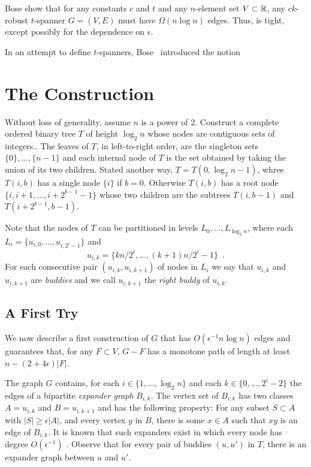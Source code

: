 \documentclass{patmorin}
\begin{document}
Bose \etal \cite[Theorem~X]{bxx} show that for any constants $c$ and $t$ and any $n$-element set $V\subset\mathbb{R}$, any $ck$-robust $t$-spanner $G=(V,E)$ must have $\Omega(n\log n)$ edges. Thus,  is tight, except possibly for the dependence on $\epsilon$.


In an attempt to define $t$-spanners, Bose \etal\ introduced the notion

\section{The Construction}


Without loss of generality, assume $n$ is a power of 2.  Construct a
complete ordered binary tree $T$ of height $\log_2 n$ whose nodes are
contiguous sets of integers..  The leaves of $T$, in left-to-right order,
are the singleton sets $\{0\},\ldots,\{n-1\}$ and each internal node of
$T$ is the set obtained by taking the union of its two children.  Stated
another way, $T=T(0,\log_2 n-1)$, whree $T(i,b)$ has a single node $\{i\}$
if $b=0$. Otherwise $T(i,b)$ has a root node $\{i,i+1,\ldots,i+2^{b-1}-1\}$
whose two children are the subtrees $T(i,b-1)$ and $T(i+2^{b-1}, b-1)$.

Note that the nodes of $T$ can be partitioned in levels $L_0,\ldots,L_{\log_2 n}$, where each $L_i=\{u_{i,0},\ldots,u_{i,2^i-1}\}$ and
\[
	u_{i,k} = \{kn/2^i,\ldots,(k+1)n/2^{i}-1\} \enspace .
\]
For each consecutive pair $(u_{i,k},u_{i,k+1})$ of nodes in $L_i$ we say
that $u_{i,k}$ and $u_{i,k+1}$ are \emph{buddies} and we call $u_{i,k+1}$
the \emph{right buddy} of $u_{i,k}$.

\subsection{A First Try}

We now describe a first construction of $G$ that has $O(\epsilon^{-1}n\log
n)$ edges and guarantees that, for any $F\subset V$,  $G-F$ has a monotone
path of length at least $n-(2+4\epsilon)|F|$.

The graph $G$ contains, for each $i\in\{1,\ldots,\log_2 n\}$ and each
$k\in\{0,\ldots,2^{i}-2\}$ the edges of a bipartite \emph{expander graph}
$B_{i,k}$.  The vertex set of $B_{i,k}$ has two classes $A=u_{i,k}$ and
$B=u_{i,k+1}$ and has the following property:  For any subset $S\subset
A$ with $|S|\ge \epsilon |A|$, and every vertex $y$ in $B$, there is
some $x\in A$ such that $xy$ is an edge of $B_{i,k}$. It is known that
such expanders exist in which every node has degree $O(\epsilon^{-1})$
\cite{X}.  Observe that for every pair of buddies $(u,u')$ in $T$,
there is an expander graph between $u$ and $u'$.
\end{document}

